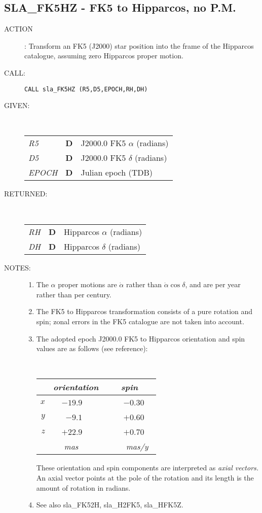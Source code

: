 \documentclass[11pt,twoside]{article}
\newcommand{\xlabel}[1]{}
\newcommand{\routine}[3]
{\hbadness=10000
  \vbox
  {
    \rule{\textwidth}{0.3mm}\\
    {\Large {\bf #1} \hfill #2 \hfill {\bf #1}}\\
    \setlength{\oldspacing}{\topsep}
    \setlength{\topsep}{0.3ex}
    \begin{description}
      #3
    \end{description}
    \setlength{\topsep}{\oldspacing}
  }
}
\renewcommand{\routine}[3]
   {
      \subsection{#1\xlabel{#1} - #2\label{#1}}
       \begin{description}
         #3
       \end{description}
   }
\newcommand{\action}[1]
{\item[ACTION]: #1}
\newcommand{\action}[1]
   {\item[ACTION:] #1}
\newcommand{\call}[1]
{\item[CALL]: \hspace{0.4em}{\tt #1}}
\newlength{\oldspacing}
\renewcommand{\call}[1]
   {
    \item[CALL:] {\tt #1}
   }
\newcommand{\args}[2]
{
  \goodbreak
  \setlength{\oldspacing}{\topsep}
  \setlength{\topsep}{0.3ex}
  \begin{description}
  \item[#1]:\\[1.5ex]
    \begin{tabular}{p{7em}p{6em}p{22em}}
      #2
    \end{tabular}
  \end{description}
  \setlength{\topsep}{\oldspacing}
}
\renewcommand{\args}[2]
   {
     \begin{description}
        \item[#1:]\\
        \begin{tabular}{p{7em}p{6em}l}
           #2
        \end{tabular}
     \end{description}
   }
\newcommand{\spec}[3]
{
  {\em {#1}} & {\bf \mbox{#2}} & {#3}
}
\newcommand{\notes}[1]
{
  \goodbreak
  \setlength{\oldspacing}{\topsep}
  \setlength{\topsep}{0.3ex}
  \begin{description}
    \item[NOTES]:
        #1
  \end{description}
  \setlength{\topsep}{\oldspacing}
}
\renewcommand{\notes}[1]
   {
      \begin{description}
         \item[NOTES:]
            #1
      \end{description}
   }
\begin{document}
\routine{SLA\_FK5HZ}{FK5 to Hipparcos, no P.M.}
{
 \action{Transform an FK5 (J2000) star position into the frame of the
         Hipparcos catalogue, assuming zero Hipparcos proper motion.}
 \call{CALL sla\_FK5HZ (R5,D5,EPOCH,RH,DH)}
}
\args{GIVEN}
{
 \spec{R5}{D}{J2000.0 FK5 $\alpha$ (radians)} \\
 \spec{D5}{D}{J2000.0 FK5 $\delta$ (radians)} \\
 \spec{EPOCH}{D}{Julian epoch (TDB)}
}
\args{RETURNED}
{
 \spec{RH}{D}{Hipparcos $\alpha$ (radians)} \\
 \spec{DH}{D}{Hipparcos $\delta$ (radians)}
}
\notes
{
 \begin{enumerate}
  \item The $\alpha$ proper motions are $\dot{\alpha}$ rather than
        $\dot{\alpha}\cos\delta$, and are per year rather than per century.
  \item The FK5 to Hipparcos
        transformation consists of a pure rotation and spin;
        zonal errors in the FK5 catalogue are not taken into account.
  \item The adopted epoch J2000.0 FK5 to Hipparcos orientation and spin
        values are as follows (see reference):

        \vspace{2ex}

        ~~~~~~~~~~~~
        \begin{tabular}{|r|r|r|} \hline
        &
        \multicolumn{1}{|c}{\it orientation} &
        \multicolumn{1}{|c|}{\it ~~~spin~~~} \\ \hline
        $x$ & $-19.9$~~~~ & ~$-0.30$~~ \\
        $y$ &  $-9.1$~~~~ & ~$+0.60$~~ \\
        $z$ & $+22.9$~~~~ & ~$+0.70$~~ \\ \hline
        & {\it mas}~~~~~ & ~{\it mas/y}~ \\ \hline
        \end{tabular}

        \vspace{3ex}

        These orientation and spin components are interpreted as
        {\it axial vectors.}  An axial vector points at the pole of
        the rotation and its length is the amount of rotation in radians.
  \item See also sla\_FK52H, sla\_H2FK5, sla\_HFK5Z.
 \end{enumerate}
}
\end{document}
